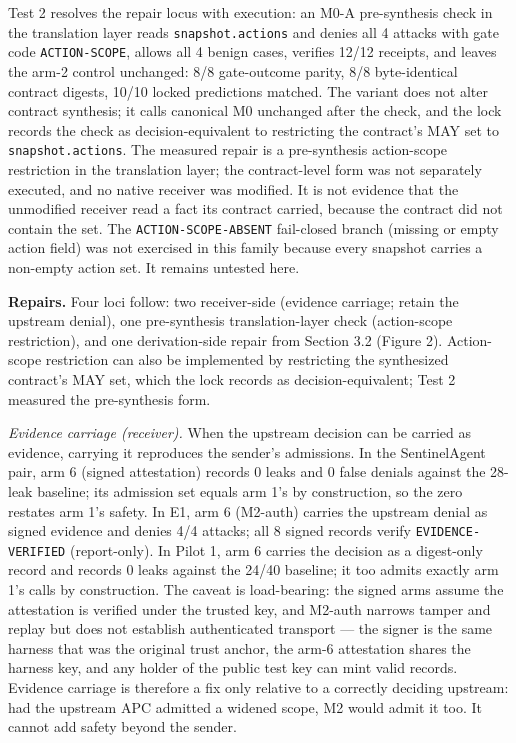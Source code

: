 \documentclass[
  10pt,
]{article}
\let\origtexttt\texttt
\renewcommand{\texttt}[1]{{\upshape\origtexttt{#1}}}
\renewcommand{\_}{\allowbreak\origunderscore}
\begin{document}
Test 2 resolves the repair locus with execution: an M0-A pre-synthesis
check in the translation layer reads \texttt{snapshot.actions} and
denies all 4 attacks with gate code \texttt{ACTION-SCOPE}, allows all 4
benign cases, verifies 12/12 receipts, and leaves the arm-2 control
unchanged: 8/8 gate-outcome parity, 8/8 byte-identical contract digests,
10/10 locked predictions matched. The variant does not alter contract
synthesis; it calls canonical M0 unchanged after the check, and the lock
records the check as decision-equivalent to restricting the contract's
MAY set to \texttt{snapshot.actions}. The measured repair is a
pre-synthesis action-scope restriction in the translation layer; the
contract-level form was not separately executed, and no native receiver
was modified. It is not evidence that the unmodified receiver read a
fact its contract carried, because the contract did not contain the set.
The \texttt{ACTION-SCOPE-ABSENT} fail-closed branch (missing or empty
action field) was not exercised in this family because every snapshot
carries a non-empty action set. It remains untested here.

\textbf{Repairs.} Four loci follow: two receiver-side (evidence
carriage; retain the upstream denial), one pre-synthesis
translation-layer check (action-scope restriction), and one
derivation-side repair from Section 3.2 (Figure 2). Action-scope
restriction can also be implemented by restricting the synthesized
contract's MAY set, which the lock records as decision-equivalent; Test
2 measured the pre-synthesis form.

\emph{Evidence carriage (receiver).} When the upstream decision can be
carried as evidence, carrying it reproduces the sender's admissions. In
the SentinelAgent pair, arm 6 (signed attestation) records 0 leaks and 0
false denials against the 28-leak baseline; its admission set equals arm
1's by construction, so the zero restates arm 1's safety. In E1, arm 6
(M2-auth) carries the upstream denial as signed evidence and denies 4/4
attacks; all 8 signed records verify \texttt{EVIDENCE-VERIFIED}
(report-only). In Pilot 1, arm 6 carries the decision as a digest-only
record and records 0 leaks against the 24/40 baseline; it too admits
exactly arm 1's calls by construction. The caveat is load-bearing: the
signed arms assume the attestation is verified under the trusted key,
and M2-auth narrows tamper and replay but does not establish
authenticated transport --- the signer is the same harness that was the
original trust anchor, the arm-6 attestation shares the harness key, and
any holder of the public test key can mint valid records. Evidence
carriage is therefore a fix only relative to a correctly deciding
upstream: had the upstream APC admitted a widened scope, M2 would admit
it too. It cannot add safety beyond the sender.
\end{document}

